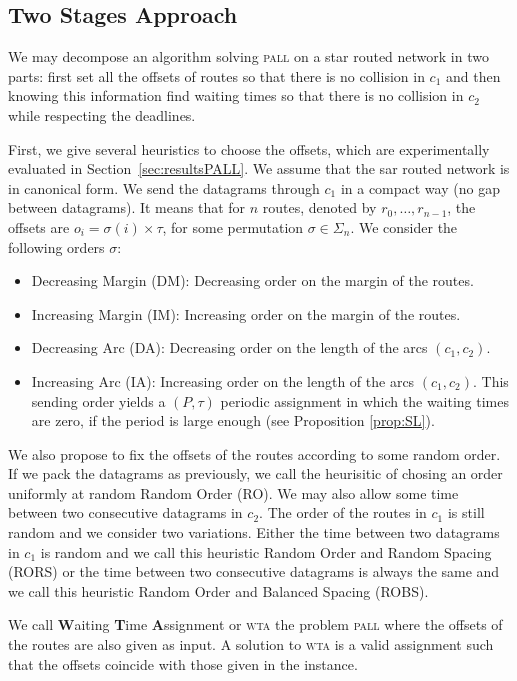 \documentclass[a4paper,10pt]{article}
\newcommand\pall{\textsc{pall}\xspace}
\newcommand\wta{\textsc{wta}\xspace}
\begin{document}
    
     \subsection{Two Stages Approach}
     
      We may decompose an algorithm solving \pall on a star routed network in two parts: first set all the offsets of routes so that there is no collision in $c_1$ and then knowing this information find waiting times so that there is no collision in $c_2$ while respecting the deadlines. 
      
     First, we give several heuristics to choose the offsets, which are experimentally evaluated in Section~\ref{sec:resultsPALL}. We assume that the sar routed network is in canonical form. 
      We send the datagrams through $c_1$ in a compact way (no gap between datagrams). It means that for $n$ routes, denoted by $r_0, \dots, r_{n-1}$, the offsets are $o_i = \sigma(i) \times \tau$, for some permutation $\sigma \in \Sigma_n$. We consider the following orders $\sigma$: 
	
	\begin{itemize}
	 \item Decreasing Margin (DM): Decreasing order on the margin of the routes.
	 \item Increasing Margin (IM): Increasing order on the margin of the routes. 
	 \item Decreasing Arc (DA): Decreasing order on the length of the arcs $(c_1,c_2)$.
	 \item Increasing Arc (IA): Increasing order on the length of the arcs $(c_1,c_2)$. This sending order yields a $(P,\tau)$ periodic assignment in which the waiting times are zero, if the period is large enough (see Proposition \ref{prop:SL}).
	\end{itemize}

    We also propose to fix the offsets of the routes according to some random order.
    If we pack the datagrams as previously, we call the heurisitic of chosing an order
    uniformly at random Random Order (RO). We may also allow some time between two consecutive datagrams in $c_2$. The order of the routes in $c_1$ is still random and we consider two variations. Either the time between two datagrams in $c_1$ is random and we call this heuristic Random Order and Random Spacing (RORS) or the time between two consecutive datagrams is always the same and we call this heuristic Random Order and Balanced Spacing (ROBS).
 	
 	We call \textbf{W}aiting \textbf{T}ime \textbf{A}ssignment or \wta the problem \pall where the offsets of the routes are also given as input. A solution to \wta
 	is a valid assignment such that the offsets coincide with those given in the instance. 
\end{document}
